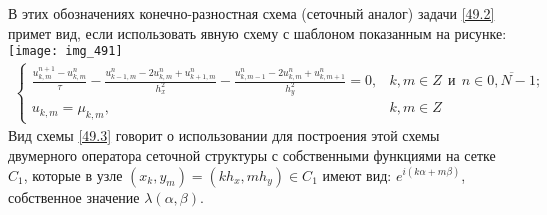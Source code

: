 \documentclass[__main__.tex]{subfiles}
\begin{document}
В этих обозначениях конечно-разностная схема (сеточный аналог) задачи \ref{49.2} примет вид, если использовать явную схему с шаблоном показанным на рисунке:\\
\texttt{[image: img\_491]}\\
\begin{gather}
\label{49.3}
\begin{cases}
\frac{u_{k,m}^{n+1} - u_{k,m}^{n}}{\tau} - \frac{u_{k-1,m}^{n} - 2u_{k,m}^{n} + u_{k+1,m}^{n}}{h_x^2} - \frac{u_{k,m-1}^{n} - 2u_{k,m}^{n} + u_{k,m+1}^{n}}{h_y^2} = 0, & k,m \in Z \ \ \text{и} \ \ n \in \overline{0,N-1};\\
u_{k,m} = \mu_{k,m}, & k,m \in Z
\end{cases}
\end{gather}
Вид схемы \ref{49.3} говорит о использовании для построения этой схемы двумерного оператора сеточной структуры с собственными функциями на сетке $C_1$, которые в узле $(x_k,y_m) = (kh_x,mh_y) \in C_1$ имеют вид: $e^{i(k\alpha + m\beta)}$, собственное значение $\lambda(\alpha,\beta)$.\\
\end{document}
